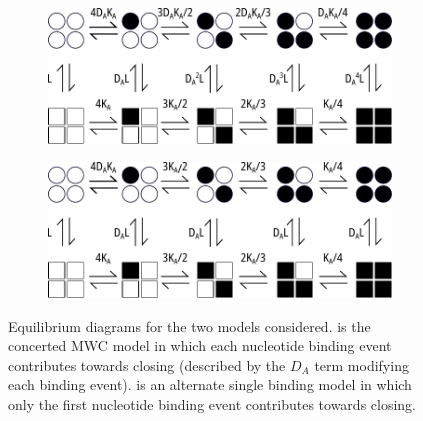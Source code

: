 \begin{figure}[h]
	\centering
	\begin{subfigure}[t]{0.9\textwidth}
		\caption{}\label{ch4fig:model_expansion_1}
		\centering
		\includegraphics[width=\textwidth]{mwc_scheme_1_expansion.pdf}
	\end{subfigure}
	\vfill
	\begin{subfigure}[t]{0.9\textwidth}
		\caption{}\label{ch4fig:model_expansion_2}
		\centering
		\includegraphics[width=\textwidth]{mwc_scheme_1_expansion_2.pdf}
	\end{subfigure}
	\caption[Full model diagrams]{
	Equilibrium diagrams for the two models considered.
	 is the concerted MWC model in which each nucleotide binding event contributes towards closing (described by the $D_A$ term modifying each binding event).
	 is an alternate single binding model in which only the first nucleotide binding event contributes towards closing.
	}\label{ch4fig:model_compare}
\end{figure}

